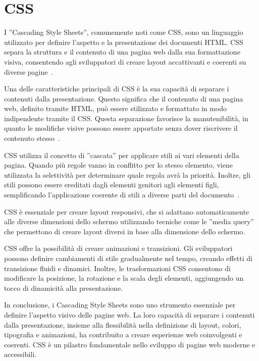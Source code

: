 \section{CSS}
I ”Cascading Style Sheets”, comunemente noti come CSS, sono un linguaggio utilizzato per definire l'aspetto e la presentazione dei documenti HTML. CSS separa la struttura e il contenuto di una pagina web dalla sua formattazione visiva, consentendo agli sviluppatori di creare layout accattivanti e coerenti su diverse pagine~\cite{Core_web}.

Una delle caratteristiche principali di CSS è la sua capacità di separare i contenuti dalla presentazione. Questo significa che il contenuto di una pagina web, definito tramite HTML, può essere stilizzato e formattato in modo indipendente tramite il CSS. Questa separazione favorisce la manutenibilità, in quanto le modifiche visive possono essere apportate senza dover riscrivere il contenuto stesso~\cite{Core_web, ALL_WEB}.

CSS utilizza il concetto di ”cascata” per applicare stili ai vari elementi della pagina. Quando più regole vanno in conflitto per lo stesso elemento, viene utilizzata la selettività per determinare quale regola avrà la priorità. Inoltre, gli stili possono essere ereditati dagli elementi genitori agli elementi figli, semplificando l'applicazione coerente di stili a diverse parti del documento~\cite{ALL_WEB}.

CSS è essenziale per creare layout responsivi, che si adattano automaticamente alle diverse dimensioni dello schermo utilizzando tecniche come le ”media query” che permettono di creare layout diversi in base alla dimensione dello schermo.

CSS offre la possibilità di creare animazioni e transizioni. Gli sviluppatori possono definire cambiamenti di stile gradualmente nel tempo, creando effetti di transizione fluidi e dinamici. Inoltre, le trasformazioni CSS consentono di modificare la posizione, la rotazione e la scala degli elementi, aggiungendo un tocco di dinamicità alla presentazione.

In conclusione, i Cascading Style Sheets sono uno strumento essenziale per definire l'aspetto visivo delle pagine web. La loro capacità di separare i contenuti dalla presentazione, insieme alla flessibilità nella definizione di layout, colori, tipografia e animazioni, ha contribuito a creare esperienze web coinvolgenti e coerenti. CSS è un pilastro fondamentale nello sviluppo di pagine web moderne e accessibili.



